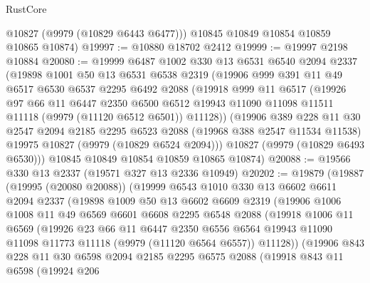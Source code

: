 \begin{lexlean}{RustCore}
\begin{coremodule}
        @10827
        (@9979 (@10829 @6443 @6477)))
      @10845
      @10849
      @10854
      @10859
      @10865
      @10874)
@19997 := @10880 @18702 @2412
@19999 := @19997 @2198 @10884
@20080 := @19999
    @6487
    @1002
    @330
    @13
    @6531
    @6540
    @2094
    @2337
    (@19898
      @1001
      @50
      @13
      @6531
      @6538
      @2319
      (@19906
        @999
        @391
        @11
        @49
        @6517
        @6530
        @6537
        @2295
        @6492
        @2088
        (@19918
          @999
          @11
          @6517
          (@19926
            @97
            @66
            @11
            @6447
            @2350
            @6500
            @6512
            @19943
            @11090
            @11098
            @11511
            @11118
            (@9979 (@11120 @6512 @6501))
            @11128))
        (@19906
          @389
          @228
          @11
          @30
          @2547
          @2094
          @2185
          @2295
          @6523
          @2088
          (@19968 @388 @2547 @11534 @11538)
          @19975
          @10827
          (@9979 (@10829 @6524 @2094)))
        @10827
        (@9979 (@10829 @6493 @6530)))
      @10845
      @10849
      @10854
      @10859
      @10865
      @10874)
@20088 := @19566 @330 @13 @2337 (@19571 @327 @13 @2336 @10949)
@20202 := @19879
    (@19887
      (@19995 (@20080 @20088))
      (@19999
        @6543
        @1010
        @330
        @13
        @6602
        @6611
        @2094
        @2337
        (@19898
          @1009
          @50
          @13
          @6602
          @6609
          @2319
          (@19906
            @1006
            @1008
            @11
            @49
            @6569
            @6601
            @6608
            @2295
            @6548
            @2088
            (@19918
              @1006
              @11
              @6569
              (@19926
                @23
                @66
                @11
                @6447
                @2350
                @6556
                @6564
                @19943
                @11090
                @11098
                @11773
                @11118
                (@9979 (@11120 @6564 @6557))
                @11128))
            (@19906
              @843
              @228
              @11
              @30
              @6598
              @2094
              @2185
              @2295
              @6575
              @2088
              (@19918
                @843
                @11
                @6598
                (@19924
                  @206

\end{coremodule}
\end{lexlean}
